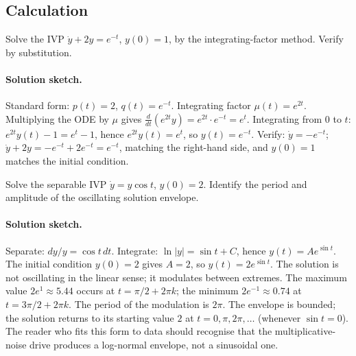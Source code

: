 \subsection*{Calculation}

\begin{exercise}
Solve the IVP $\dot{y} + 2 y = e^{-t}$, $y(0) = 1$, by the
integrating-factor method. Verify by substitution.

\paragraph{Solution sketch.} Standard form: $p(t) = 2$, $q(t) =
e^{-t}$. Integrating factor $\mu(t) = e^{2 t}$. Multiplying the
ODE by $\mu$ gives $\frac{d}{dt}(e^{2 t} y) = e^{2 t} \cdot e^{-t}
= e^{t}$. Integrating from $0$ to $t$: $e^{2 t} y(t) - 1 = e^{t}
- 1$, hence $e^{2 t} y(t) = e^{t}$, so $y(t) = e^{-t}$. Verify:
$\dot{y} = -e^{-t}$; $\dot{y} + 2 y = -e^{-t} + 2 e^{-t} = e^{-t}$,
matching the right-hand side, and $y(0) = 1$ matches the initial
condition.
\end{exercise}

\begin{exercise}
Solve the separable IVP $\dot{y} = y \cos t$, $y(0) = 2$. Identify
the period and amplitude of the oscillating solution envelope.

\paragraph{Solution sketch.} Separate: $dy/y = \cos t \, dt$.
Integrate: $\ln |y| = \sin t + C$, hence $y(t) = A e^{\sin t}$.
The initial condition $y(0) = 2$ gives $A = 2$, so $y(t) = 2
e^{\sin t}$. The solution is not oscillating in the linear sense;
it modulates between extremes. The maximum value $2 e^{1}
\approx 5.44$ occurs at $t = \pi/2 + 2\pi k$; the minimum
$2 e^{-1} \approx 0.74$ at $t = 3\pi/2 + 2\pi k$. The period of
the modulation is $2\pi$. The envelope is bounded; the solution
returns to its starting value $2$ at $t = 0, \pi, 2\pi, \ldots$
(whenever $\sin t = 0$). The reader who fits this form to data
should recognise that the multiplicative-noise drive produces a
log-normal envelope, not a sinusoidal one.
\end{exercise}

